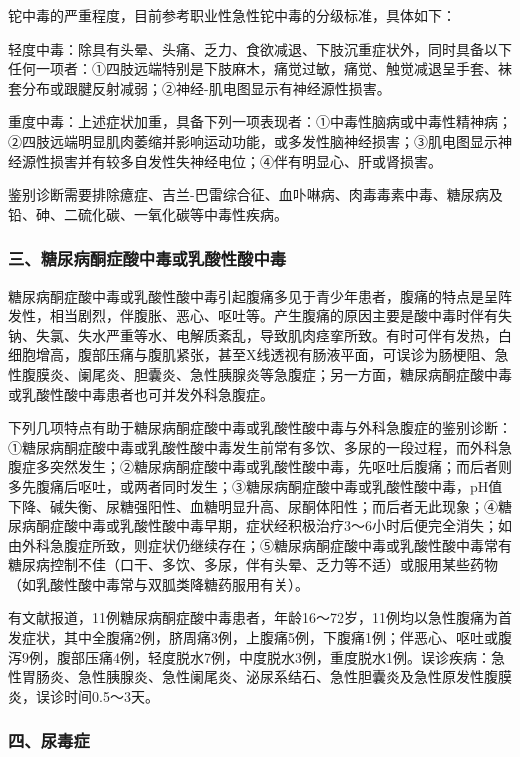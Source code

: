 铊中毒的严重程度，目前参考职业性急性铊中毒的分级标准，具体如下：

轻度中毒：除具有头晕、头痛、乏力、食欲减退、下肢沉重症状外，同时具备以下任何一项者：①四肢远端特别是下肢麻木，痛觉过敏，痛觉、触觉减退呈手套、袜套分布或跟腱反射减弱；②神经-肌电图显示有神经源性损害。

重度中毒：上述症状加重，具备下列一项表现者：①中毒性脑病或中毒性精神病；②四肢远端明显肌肉萎缩并影响运动功能，或多发性脑神经损害；③肌电图显示神经源性损害并有较多自发性失神经电位；④伴有明显心、肝或肾损害。

鉴别诊断需要排除癔症、吉兰-巴雷综合征、血卟啉病、肉毒毒素中毒、糖尿病及铅、砷、二硫化碳、一氧化碳等中毒性疾病。

\subsubsection{三、糖尿病酮症酸中毒或乳酸性酸中毒}

糖尿病酮症酸中毒或乳酸性酸中毒引起腹痛多见于青少年患者，腹痛的特点是呈阵发性，相当剧烈，伴腹胀、恶心、呕吐等。产生腹痛的原因主要是酸中毒时伴有失钠、失氯、失水严重等水、电解质紊乱，导致肌肉痉挛所致。有时可伴有发热，白细胞增高，腹部压痛与腹肌紧张，甚至X线透视有肠液平面，可误诊为肠梗阻、急性腹膜炎、阑尾炎、胆囊炎、急性胰腺炎等急腹症；另一方面，糖尿病酮症酸中毒或乳酸性酸中毒患者也可并发外科急腹症。

下列几项特点有助于糖尿病酮症酸中毒或乳酸性酸中毒与外科急腹症的鉴别诊断：①糖尿病酮症酸中毒或乳酸性酸中毒发生前常有多饮、多尿的一段过程，而外科急腹症多突然发生；②糖尿病酮症酸中毒或乳酸性酸中毒，先呕吐后腹痛；而后者则多先腹痛后呕吐，或两者同时发生；③糖尿病酮症酸中毒或乳酸性酸中毒，pH值下降、碱失衡、尿糖强阳性、血糖明显升高、尿酮体阳性；而后者无此现象；④糖尿病酮症酸中毒或乳酸性酸中毒早期，症状经积极治疗3～6小时后便完全消失；如由外科急腹症所致，则症状仍继续存在；⑤糖尿病酮症酸中毒或乳酸性酸中毒常有糖尿病控制不佳（口干、多饮、多尿，伴有头晕、乏力等不适）或服用某些药物（如乳酸性酸中毒常与双胍类降糖药服用有关）。

有文献报道，11例糖尿病酮症酸中毒患者，年龄16～72岁，11例均以急性腹痛为首发症状，其中全腹痛2例，脐周痛3例，上腹痛5例，下腹痛1例；伴恶心、呕吐或腹泻9例，腹部压痛4例，轻度脱水7例，中度脱水3例，重度脱水1例。误诊疾病：急性胃肠炎、急性胰腺炎、急性阑尾炎、泌尿系结石、急性胆囊炎及急性原发性腹膜炎，误诊时间0.5～3天。

\subsubsection{四、尿毒症}

